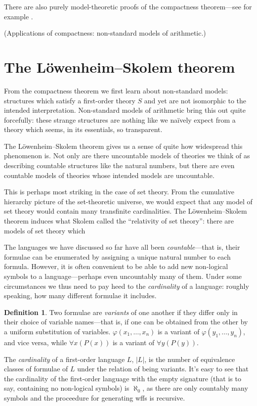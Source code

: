 \documentclass[10pt, a4paper, oneside]{article}
\theoremstyle{definition}
\newtheorem{dfn}[thm]{Definition}
\theoremstyle{remark}
\theoremstyle{plain}
\begin{document}
There are also purely model-theoretic proofs of the compactness theorem---see
for example \citet[pp. 125--127]{hodges1997}.

(Applications of compactness: non-standard models of arithmetic.)


\section{The Löwenheim--Skolem theorem}

From the compactness theorem we first learn about non-standard models:
structures which satisfy a first-order theory $S$ and yet are not isomorphic to
the intended interpretation. Non-standard models of arithmetic bring this out
quite forcefully: these strange structures are nothing like we naïvely expect
from a theory which seems, in its essentials, so transparent.

The Löwenheim--Skolem theorem gives us a sense of quite how widespread this
phenomenon is. Not only are there uncountable models of theories we think of as
describing countable structures like the natural numbers, but there are even
countable models of theories whose intended models are uncountable.

This is perhaps most striking in the case of set theory. From the cumulative
hierarchy picture of the set-theoretic universe, we would expect that any model
of set theory would contain many transfinite cardinalities. The
Löwenheim--Skolem theorem induces what Skolem called the ``relativity of set
theory'': there are models of set theory which

The languages we have discussed so far have all been \emph{countable}---that is,
their formulae can be enumerated by assigning a unique natural number to each
formula. However, it is often convenient to be able to add new non-logical
symbols to a language---perhaps even uncountably many of them. Under some
circumstances we thus need to pay heed to the \emph{cardinality} of a language:
roughly speaking, how many different formulae it includes.

\begin{dfn}
    Two formulae are \emph{variants} of one another if they differ only in their
    choice of variable names---that is, if one can be obtained from the other by
    a uniform substitution of variables. $\varphi(x_1, \dotsc, x_n)$ is a
    variant of $\varphi(y_1, \dotsc, y_n)$, and vice versa, while
    $\forall{x} (P(x))$ is a variant of $\forall{y} (P(y))$.
    
    The \emph{cardinality} of a first-order language $L$, $|L|$, is the number
    of equivalence classes of formulae of $L$ under the relation of being
    variants. It's easy to see that the cardinality of the first-order language
    with the empty signature (that is to say, containing no non-logical symbols)
    is $\aleph_0$, as there are only countably many symbols and the proceedure
    for generating wffs is recursive.
\end{dfn}
\end{document}
